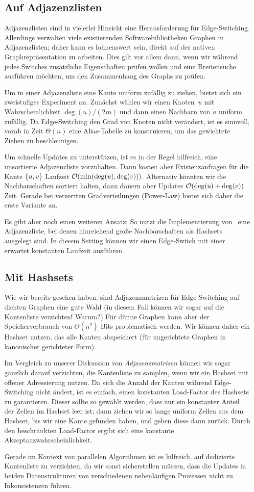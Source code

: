 \subsection{Auf Adjazenzlisten}
Adjazenzlisten sind in vielerlei Hinsicht eine Herausforderung für Edge-Switching.
Allerdings verwalten viele existierenden Softwarebibliotheken Graphen in Adjazenzlisten; daher kann es lohnenswert sein, direkt auf der nativen Graphrepräsentation zu arbeiten.
Dies gilt vor allem dann, wenn wir während jedes Switches zusätzliche Eigenschaften prüfen wollen und \zB eine Breitensuche ausführen möchten, um den Zusammenhang des Graphs zu prüfen.

Um in einer Adjazenzliste eine Kante uniform zufällig zu ziehen, bietet sich ein zweistufiges Experiment an.
Zunächst wählen wir einen Knoten~$u$ mit Wahrscheinlichkeit $\deg(u) / (2m)$ und dann einen Nachbarn von $u$ uniform zufällig.
Da Edge-Switching den Grad von Knoten nicht verändert, ist es sinnvoll, vorab in Zeit $\Theta(n)$ eine Alias-Tabelle zu konstruieren, um das gewichtete Ziehen zu beschleunigen.

Um schnelle Updates zu unterstützen, ist es in der Regel hilfreich, eine unsortierte Adjazenzliste vorzuhalten.
Dann kosten aber Existenzanfragen für die Kante $\left\{u,v\right\}$ Laufzeit $\mathcal{O}\!\left(\min(\deg(u), \deg(v))\right)$.
Alternativ könnten wir die Nachbarschaften sortiert halten, dann dauern aber Updates $\mathcal{O}\!\left(\deg(u) + \deg(v)\right)$ Zeit.
Gerade bei verzerrten Gradverteilungen (\zB Power-Law) bietet sich daher die erste Variante an.

Es gibt aber noch einen weiteren Ansatz: So nutzt die Implementierung von~\cite{DBLP:journals/compnet/VigerL16} eine Adjazenzliste, bei denen hinreichend große Nachbarschaften als Hashsets ausgelegt sind.
In diesem Setting können wir einen Edge-Switch mit einer erwartet konstanten Laufzeit ausführen.

\subsection{Mit Hashsets}
Wie wir bereits gesehen haben, sind Adjazenzmatrizen für Edge-Switching auf dichten Graphen eine gute Wahl (in diesem Fall können wir sogar auf die Kantenliste verzichten! Warum?)
Für dünne Graphen kann aber der Speicherverbrauch von $\Theta(n^2)$ Bits problematisch werden.
Wir können daher ein Hashset nutzen, das alle Kanten abspeichert (für ungerichtete Graphen in kanonischer gerichteter Form).

Im Vergleich zu unserer Diskussion von \emph{Adjazenzmatrizen} können wir sogar gänzlich darauf verzichten, die Kantenliste zu samplen, wenn wir ein Hashset mit offener Adressierung nutzen.
Da sich die Anzahl der Kanten während Edge-Switching nicht ändert, ist es einfach, einen konstanten Load-Factor des Hashsets zu garantieren.
Dieser sollte so gewählt werden, dass nur ein konstanter Anteil der Zellen im Hashset leer ist;
dann ziehen wir so lange uniform Zellen aus dem Hashset, bis wir eine Kante gefunden haben, und geben diese dann zurück.
Durch den beschränkten Load-Factor ergibt sich eine konstante Akzeptanzwahrscheinlichkeit.

Gerade im Kontext von parallelen Algorithmen ist es hilfreich, auf dedizierte Kantenliste zu verzichten, da wir sonst sicherstellen müssen, dass die Updates in beiden Datenstrukturen von verschiedenen nebenläufigen Prozessen nicht zu Inkonsistenzen führen.
